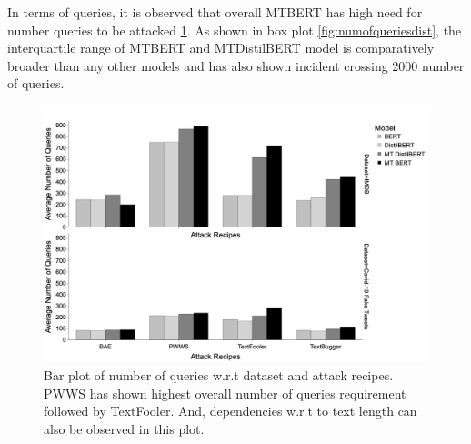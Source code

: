 \documentclass[%
	BCOR=8mm, %
	DIV=12,
	toc=bibliography, %
	toc=listof, %
	oneside, %
	egregdoesnotlikesansseriftitles, %
	]{scrbook}
\begin{document}
In terms of queries, it is observed that overall MTBERT has high need for number queries to be attacked \ref{fig:avgnquebyattackrecipes}. As shown in box plot \ref{fig:numofqueriesdist}, the interquartile range of MTBERT and MTDistilBERT model is comparatively broader than any other models and has also shown incident crossing 2000 number of queries. \\

\begin{figure}[H]
	\centering
    \includegraphics[width=.8\linewidth]{img/AvgNQuebyDataset}
	\caption[Bar plot of number of queries]{Bar plot of number of queries w.r.t dataset and attack recipes. PWWS has shown highest overall number of queries requirement followed by TextFooler.  And, dependencies w.r.t to text length can also be observed in this plot.}
	\label{fig:avgnquebyattackrecipes}
\end{figure}
\end{document}
